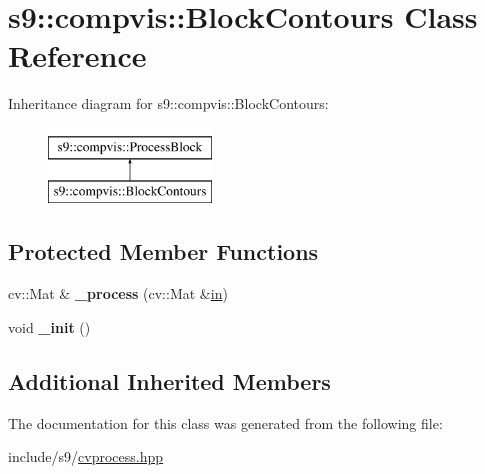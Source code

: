 \hypertarget{classs9_1_1compvis_1_1BlockContours}{\section{s9\-:\-:compvis\-:\-:Block\-Contours Class Reference}
\label{classs9_1_1compvis_1_1BlockContours}
}
Inheritance diagram for s9\-:\-:compvis\-:\-:Block\-Contours\-:\begin{figure}[H]
\begin{center}
\leavevmode
\includegraphics[height=2.000000cm]{classs9_1_1compvis_1_1BlockContours}
\end{center}
\end{figure}
\subsection*{Protected Member Functions}
\begin{DoxyCompactItemize}
\item 
\hypertarget{classs9_1_1compvis_1_1BlockContours_ad54b70506555865959a9ac7604591683}{cv\-::\-Mat \& {\bfseries \-\_\-process} (cv\-::\-Mat \&\hyperlink{structin}{in})}\label{classs9_1_1compvis_1_1BlockContours_ad54b70506555865959a9ac7604591683}

\item 
\hypertarget{classs9_1_1compvis_1_1BlockContours_a922e1ee73321dc1915c3aff43aff5e90}{void {\bfseries \-\_\-init} ()}\label{classs9_1_1compvis_1_1BlockContours_a922e1ee73321dc1915c3aff43aff5e90}

\end{DoxyCompactItemize}
\subsection*{Additional Inherited Members}


The documentation for this class was generated from the following file\-:\begin{DoxyCompactItemize}
\item 
include/s9/\hyperlink{cvprocess_8hpp}{cvprocess.\-hpp}\end{DoxyCompactItemize}
